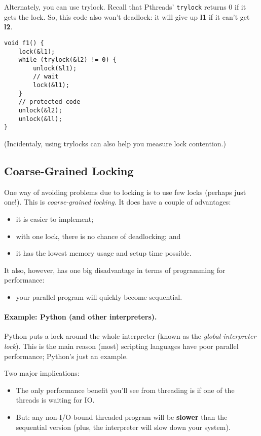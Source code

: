 \documentclass[11pt]{article}
\newenvironment{itemizep}{
 \begin{itemize}
  \setlength{\itemsep}{0pt}
  \setlength{\parsep}{3pt}
  \setlength{\topsep}{3pt}
  \setlength{\partopsep}{0pt}
  \setlength{\leftmargin}{1.5em}
  \setlength{\labelwidth}{1em}
  \setlength{\labelsep}{0.5em} }
 {\end{itemize}}
\begin{document}
Alternately, you can use trylock. Recall that Pthreads' {\tt trylock}
returns 0 if it gets the lock.  So, this code also won't deadlock: it
will give up {\bf l1} if it can't get {\bf l2}.
  \begin{lstlisting}
void f1() {
    lock(&l1);
    while (trylock(&l2) != 0) {
        unlock(&l1);
        // wait
        lock(&l1);
    }
    // protected code
    unlock(&l2);
    unlock(&ll);    
}
  \end{lstlisting}
  (Incidentaly, using trylocks can also help you measure lock contention.)

\subsection*{Coarse-Grained Locking}
One way of avoiding problems due to locking is to use few locks
(perhaps just one!). This is \emph{coarse-grained locking}.
It does have a couple of advantages:
  \begin{itemizep}
    \item it is easier to implement;
    \item with one lock, there is no chance of deadlocking; and
    \item it has the lowest memory usage and setup time possible.
  \end{itemizep}

It also, however, has one big disadvantage in terms of programming for performance:
  \begin{itemizep}
    \item your parallel program will quickly become sequential.
  \end{itemizep}

\paragraph{Example: Python (and other interpreters).}
Python puts a lock around the whole interpreter (known as the
\emph{global interpreter lock}).  This is the main reason (most)
scripting languages have poor parallel performance; Python's just an
example.

Two major implications:
\begin{itemizep}
\item The only performance benefit you'll see from threading is if one of the threads is
      waiting for IO.
\item But: any non-I/O-bound threaded program will be {\bf slower} than the sequential
      version (plus, the interpreter will slow down your system).
\end{itemizep}
\end{document}
